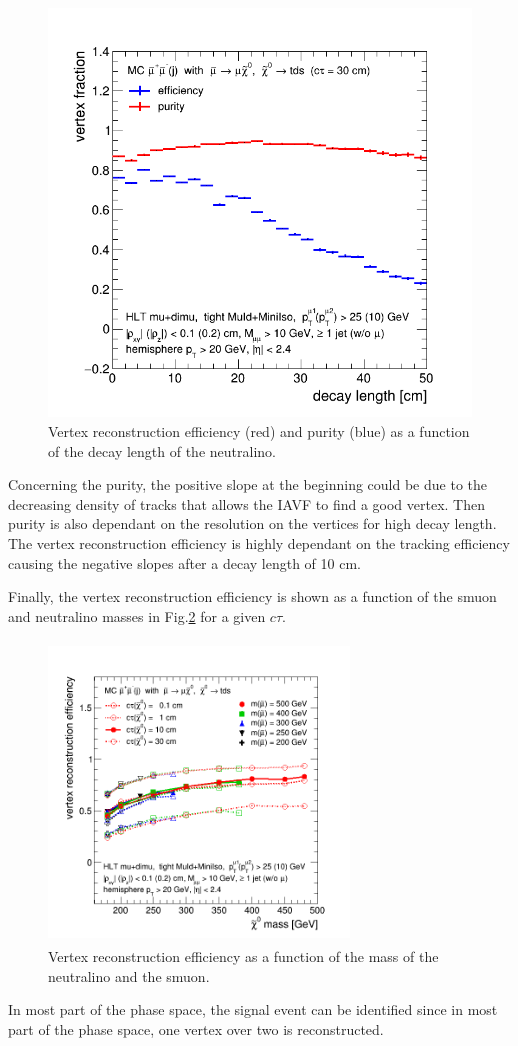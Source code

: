 \documentclass{cernatlasnote}
\begin{document}
\begin{figure}
    \centering
    \includegraphics[width=0.5\linewidth]{images/VTXEff/eff_dist_ctau300.png}
    \caption{Vertex reconstruction efficiency (red) and purity (blue) as a function of the decay length of the neutralino.}
    \label{fig:VTXEff}
\end{figure}
\FloatBarrier   
 Concerning the purity, the positive slope at the beginning could be due to the decreasing density of tracks that allows the IAVF to find a good vertex. Then purity is also dependant on the resolution on the vertices for high decay length. The vertex reconstruction efficiency is highly dependant on the tracking efficiency causing the negative slopes after a decay length of 10 cm.

Finally, the vertex reconstruction efficiency is shown as a function of the smuon and neutralino masses in Fig.\ref{fig:VTXEffmass} for a given $c\tau$.
\begin{figure}[ht]
\centering
\includegraphics[height=8cm, width=8cm, trim= 0cm 0cm 0cm 0cm,clip]{images/VTXEff/eff_ctau_240328.png}
\caption{\label{fig:VTXEffmass} Vertex reconstruction efficiency as a function of the mass of the neutralino and the smuon.}
\end{figure}   
 In most part of the phase space, the signal event can be identified since in most part of the phase space, one vertex over two is reconstructed.
\end{document}

